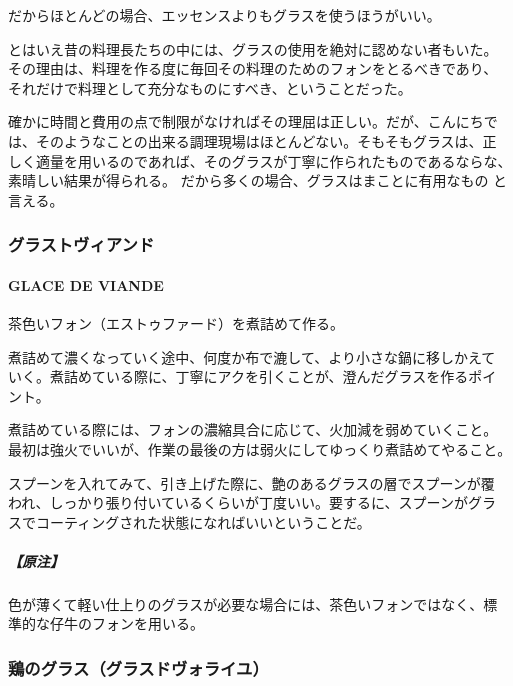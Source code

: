 \documentclass[twoside,12Q,b5j]{escoffierltjsbook}
\newenvironment{recette}{\begin{multicols}{2}}{\end{multicols}}
\begin{document}
\begin{recette}
だからほとんどの場合、エッセンスよりもグラスを使うほうがいい。

とはいえ昔の料理長たちの中には、グラスの使用を絶対に認めない者もいた。
その理由は、料理を作る度に毎回その料理のためのフォンをとるべきであり、
それだけで料理として充分なものにすべき、ということだった。

確かに時間と費用の点で制限がなければその理屈は正しい。だが、こんにちで
は、そのようなことの出来る調理現場はほとんどない。そもそもグラスは、正
しく適量を用いるのであれば、そのグラスが丁寧に作られたものであるならな、
素晴しい結果が得られる。 だから多くの場合、グラスはまことに有用なもの
と言える。

\vspace*{2\zw}

\subsubsection{グラストヴィアンド}\label{ux30b0ux30e9ux30b9ux30c8ux30f4ux30a3ux30a2ux30f3ux30c9}

\paragraph{GLACE DE VIANDE}\label{glace-de-viande}


茶色いフォン（エストゥファード）を煮詰めて作る。

煮詰めて濃くなっていく途中、何度か布で漉して、より小さな鍋に移しかえて
いく。煮詰めている際に、丁寧にアクを引くことが、澄んだグラスを作るポイ
ント。

煮詰めている際には、フォンの濃縮具合に応じて、火加減を弱めていくこと。
最初は強火でいいが、作業の最後の方は弱火にしてゆっくり煮詰めてやること。

スプーンを入れてみて、引き上げた際に、艶のあるグラスの層でスプーンが覆
われ、しっかり張り付いているくらいが丁度いい。要するに、スプーンがグラ
スでコーティングされた状態になればいいということだ。

\subparagraph{【原注】}\label{ux539fux6ce8-5}

色が薄くて軽い仕上りのグラスが必要な場合には、茶色いフォンではなく、標
準的な仔牛のフォンを用いる。

\vspace*{2\zw}

\subsubsection{鶏のグラス（グラスドヴォライユ）}\label{ux9d8fux306eux30b0ux30e9ux30b9ux30b0ux30e9ux30b9ux30c9ux30f4ux30a9ux30e9ux30a4ux30e6}


\end{recette}
\end{document}
